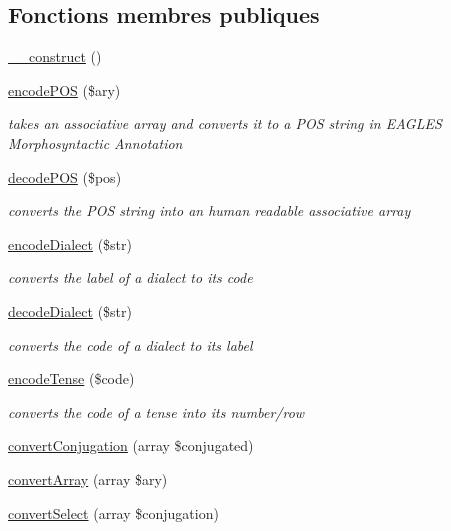 \subsection*{Fonctions membres publiques}
\begin{DoxyCompactItemize}
\item 
\hyperlink{class_converter_indexation_affb2c0b377c55d112b89150204d9e85f}{\+\_\+\+\_\+construct} ()
\item 
\hyperlink{class_converter_indexation_a8b52ecc585f7423456ae6aaf5df2436f}{encode\+P\+OS} (\$ary)
\begin{DoxyCompactList}\small\item\em takes an associative array and converts it to a P\+OS string in E\+A\+G\+L\+ES Morphosyntactic Annotation \end{DoxyCompactList}\item 
\hyperlink{class_converter_indexation_a6012e4df4619a7cc1c55c811fc50690d}{decode\+P\+OS} (\$pos)
\begin{DoxyCompactList}\small\item\em converts the P\+OS string into an human readable associative array \end{DoxyCompactList}\item 
\hyperlink{class_converter_indexation_ab9501f7ab3dad7daa338023522f03949}{encode\+Dialect} (\$str)
\begin{DoxyCompactList}\small\item\em converts the label of a dialect to its code \end{DoxyCompactList}\item 
\hyperlink{class_converter_indexation_a138e9e08f03d5a14fc53d367c9c739de}{decode\+Dialect} (\$str)
\begin{DoxyCompactList}\small\item\em converts the code of a dialect to its label \end{DoxyCompactList}\item 
\hyperlink{class_converter_indexation_aeabe347658ec9c09bf8ca65262ef6fa8}{encode\+Tense} (\$code)
\begin{DoxyCompactList}\small\item\em converts the code of a tense into its number/row \end{DoxyCompactList}\item 
\hyperlink{class_converter_indexation_a3d6b48ec5eaf46b9a2a8b3bdc200e063}{convert\+Conjugation} (array \$conjugated)
\item 
\hyperlink{class_converter_indexation_a171eb2b7d4d6452218212da881972dfd}{convert\+Array} (array \$ary)
\item 
\hyperlink{class_converter_indexation_a066755523513b6c4197765c631c7b248}{convert\+Select} (array \$conjugation)
\end{DoxyCompactItemize}


